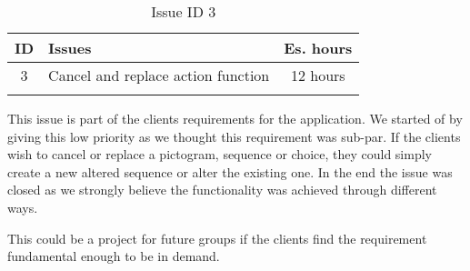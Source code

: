 \begin{longtable} { | c | p{12cm} | c | } 
\hline
	ID 	&	Issues	&		 Es. hours \\\hline
	3 	&	Cancel and replace action function	&	12 hours \\\hline
\caption{Issue ID 3}
\label{tab:spr3_cancelreplaceaction}
\end{longtable}

This issue is part of the clients requirements for the application. We started of by giving this low priority as we thought this requirement was sub-par. If the clients wish to cancel or replace a pictogram, sequence or choice, they could simply create a new altered sequence or alter the existing one. In the end the issue was closed as we strongly believe the functionality was achieved through different ways.

This could be a project for future groups if the clients find the requirement fundamental enough to be in demand.
